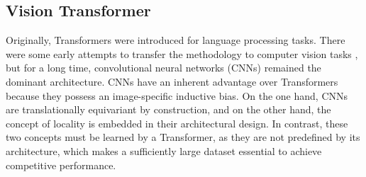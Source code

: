 %
%
%

\subsection{Vision Transformer}
Originally, Transformers were introduced for language processing tasks. There were some early attempts to transfer the methodology to computer vision tasks \cite{StandAloneAttentionVisonModels, Ccnet, ImageTransformer}, but for a long time, convolutional neural networks (\gls{CNN}s) \cite{MNIST} remained the dominant architecture. \gls{CNN}s have an inherent advantage over Transformers because they possess an image-specific inductive bias. On the one hand, \gls{CNN}s are translationally equivariant by construction, and on the other hand, the concept of locality is embedded in their architectural design. In contrast, these two concepts must be learned by a Transformer, as they are not predefined by its architecture, which makes a sufficiently large dataset essential to achieve competitive performance. \\


